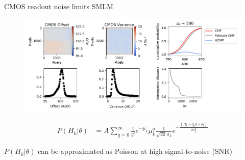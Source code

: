\documentclass{beamer}					%
\begin{document}
\begin{frame}{CMOS readout noise limits SMLM}

\begin{figure}
\includegraphics[width=13cm]{Noise.png}
\end{figure}

\begin{align}
P(H_{k}|\theta) &=  A\sum_{q=0}^{\infty} \frac{1}{q!}e^{-\mu_{k}}\mu_{k}^{q}\frac{1}{\sqrt{2\pi}\sigma_{k}}e^{-\frac{(H_{k}-g_{k}q-o_{k})}{2\sigma_{k}^{2}}}
\end{align}


$P(H_{k}|\theta)$ can be approximated as Poisson at high signal-to-noise ($\mathrm{SNR}$)
 
\end{frame}
\end{document}
